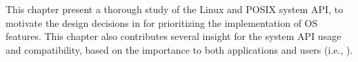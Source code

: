 This chapter present a thorough study of the Linux and POSIX system API,
to motivate the design decisions in \graphene{} for prioritizing the implementation of OS features.
This chapter also contributes several insight
for the system API usage and compatibility, based on the importance to both applications and users (i.e., \compatmetric{}). 
